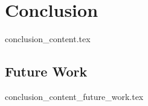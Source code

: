 \chapter{Conclusion}
  {conclusion_content.tex}
\section{Future Work}
  {conclusion_content_future_work.tex}
